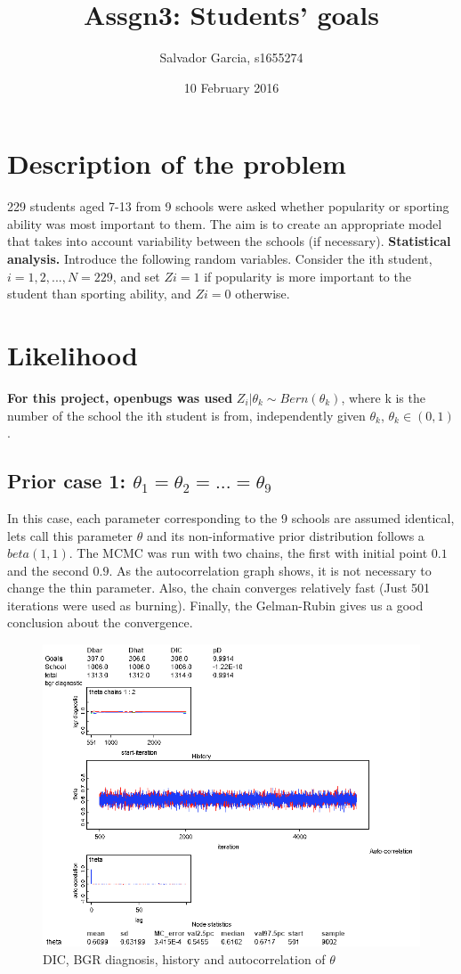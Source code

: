 \documentclass{article}
\author{Salvador Garcia, s1655274}
\date{10 February 2016}
\title{Assgn3: Students' goals}
\begin{document}
\maketitle
\section{Description of the problem} 
  
229 students aged 7-13 from 9 schools were asked whether popularity or sporting ability was most important to them. The aim is to create an appropriate model that takes into account variability between the schools (if necessary).
\textbf{Statistical analysis.}
Introduce the following random variables. Consider the ith student, $i = 1, 2, ... ,N = 229$, and set $Zi = 1$ if popularity is more important to the student than sporting ability, and $Zi = 0$ otherwise.

\section{Likelihood}

\textbf{For this project, openbugs was used}
$Z_i | \theta_k \sim Bern(\theta_k)$, where k is the number of the school the ith student is from, independently given $\theta_k$, $\theta_k \in (0, 1)$.
  
\subsection{Prior case 1: $\theta_1 = \theta_2 = ... = \theta_9$}
In this case, each parameter corresponding to the 9 schools are assumed identical, lets call this parameter $\theta$ and its non-informative prior distribution follows a $beta(1,1)$. The MCMC was run with two chains, the first with initial point $0.1$ and the second $0.9$. As the autocorrelation graph shows, it is not necessary to change the thin parameter. Also, the chain converges relatively fast (Just 501 iterations were used as burning). Finally, the Gelman-Rubin gives us a good conclusion about the convergence. 
  
  \begin{figure}[ht!]
  \centering
  \includegraphics[width=.75\textwidth]{imgs/M1.png}
  \caption{DIC, BGR diagnosis, history and autocorrelation of $\theta$}
  \label{fig:fig1}
  \end{figure}
\end{document}
